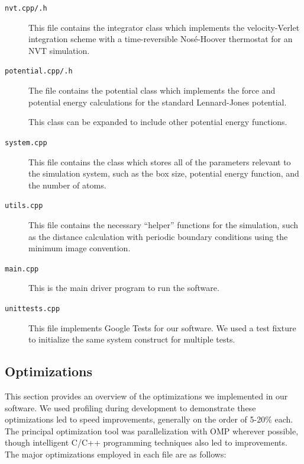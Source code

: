 \documentclass[12pt]{article}
\begin{document}
\begin{description}
\item[\texttt{nvt.cpp/.h}] This file contains the integrator class which implements the velocity-Verlet integration scheme with a time-reversible Nos\'{e}-Hoover thermostat for an NVT simulation.

\item[\texttt{potential.cpp/.h}] The file contains the potential class which implements the force and potential energy calculations for the standard Lennard-Jones potential.

%
This class can be expanded to include other potential energy functions.

\item[\texttt{system.cpp}] This file contains the class which stores all of the parameters relevant to the simulation system, such as the box size, potential energy function, and the number of atoms.

\item[\texttt{utils.cpp}] This file contains the necessary ``helper'' functions for the simulation, such as the distance calculation with periodic boundary conditions using the minimum image convention.

\item[\texttt{main.cpp}] This is the main driver program to run the software.

\item[\texttt{unittests.cpp}] This file implements Google Tests for our software.
%
We used a test fixture to initialize the same system construct for multiple tests.

\end{description}

\subsection{Optimizations}
This section provides an overview of the optimizations we implemented in our software.  We used profiling during development to demonstrate these optimizations led to speed improvements, generally on the order of 5-20\% each.  The principal optimization tool was parallelization with OMP wherever possible, though intelligent C/C++ programming techniques also led to improvements. The major optimizations employed in each file are as follows:
\end{document}
